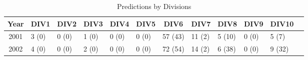 	\begin{table}[h!]
		\centering
		\scriptsize
		\caption{Predictions by Divisions}
		\begin{threeparttable}
			\begin{tabular}{clllllllllll}
				\toprule
				Year  & \multicolumn{1}{c}{DIV1} & \multicolumn{1}{c}{DIV2} & \multicolumn{1}{c}{DIV3} & \multicolumn{1}{c}{DIV4} & \multicolumn{1}{c}{DIV5} & \multicolumn{1}{c}{DIV6} & \multicolumn{1}{c}{DIV7} & \multicolumn{1}{c}{DIV8} & \multicolumn{1}{c}{DIV9} & \multicolumn{1}{c}{DIV10} \\
				\midrule
				2001  & 3\tnote{1} (0)\tnote{2} & 0 (0) & 1 (0) & 0 (0) & 0 (0) & 57 (43) & 11 (2) & 5 (10) & 0 (0) & 5 (7) \\
				2002  & 4 (0) & 0 (0) & 2 (0) & 0 (0) & 0 (0) & 72 (54) & 14 (2) & 6 (38) & 0 (0) & 9 (32) \\

\end{tabular}
\end{threeparttable}
\end{table}
